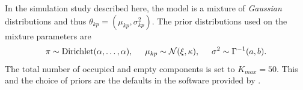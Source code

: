 \documentclass{bioinfo}
\begin{document}
\begin{methods}
In the simulation study described here, the model is a mixture of \emph{Gaussian} distributions and thus \(\theta_{kp}=(\mu_{kp}, \sigma^2_{kp})\). The prior distributions used on the mixture parameters are
\begin{align}
	\pi \sim \textrm{Dirichlet}(\alpha, \ldots, \alpha), \hspace{0.5cm} \mu_{kp} \sim \mathcal{N}(\xi, \kappa), \hspace{0.5cm} \sigma^2 \sim \Gamma^{-1}(a, b). \nonumber
\end{align}
The total number of occupied and empty components is set to $K_{max}=50$. This and the choice of priors are the defaults in the software provided by \cite{mason2016mdi}.



\end{methods}
\end{document}
